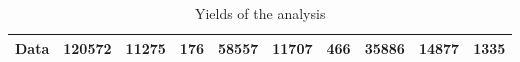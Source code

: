\documentclass[10pt]{article}
\begin{document}
\begin{table}[htbp]
\begin{center}
\begin{tabular}{|c|c|c|c|c|c|c|c|c|c|}
\hline 
  Data   & 120572 & 11275 & 176 & 58557 & 11707 & 466 & 35886 & 14877 & 1335 \\ 
\hline 
\end{tabular} 
\caption{Yields of the analysis} 
\end{center} 
\end{table} 
\end{document}
